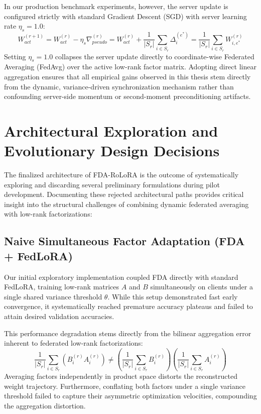 In our production benchmark experiments, however, the server update is configured strictly with standard Gradient Descent (SGD) with server learning rate $\eta_s = 1.0$:
\begin{equation}
    W_{act}^{(r+1)} = W_{act}^{(r)} - \eta_s \nabla_{pseudo}^{(r)} = W_{act}^{(r)} + \frac{1}{|S_r|} \sum_{i \in S_r} \Delta_i^{(e^*)} = \frac{1}{|S_r|} \sum_{i \in S_r} W_{i, e^*}^{(r)}
    \label{eq:server_fedavg}
\end{equation}
Setting $\eta_s = 1.0$ collapses the server update directly to coordinate-wise Federated Averaging (FedAvg) over the active low-rank factor matrix. Adopting direct linear aggregation ensures that all empirical gains observed in this thesis stem directly from the dynamic, variance-driven synchronization mechanism rather than confounding server-side momentum or second-moment preconditioning artifacts.

\section{Architectural Exploration and Evolutionary Design Decisions}
\label{sec:architectural_exploration}

The finalized architecture of FDA-RoLoRA is the outcome of systematically exploring and discarding several preliminary formulations during pilot development. Documenting these rejected architectural paths provides critical insight into the structural challenges of combining dynamic federated averaging with low-rank factorizations:

\subsection{Naive Simultaneous Factor Adaptation (FDA + FedLoRA)}
Our initial exploratory implementation coupled FDA directly with standard FedLoRA, training low-rank matrices $A$ and $B$ simultaneously on clients under a single shared variance threshold $\theta$. While this setup demonstrated fast early convergence, it systematically reached premature accuracy plateaus and failed to attain desired validation accuracies. 

This performance degradation stems directly from the bilinear aggregation error inherent to federated low-rank factorizations:
\begin{equation*}
    \frac{1}{|S_r|} \sum_{i \in S_r} \left( B_i^{(r)} A_i^{(r)} \right) \neq \left( \frac{1}{|S_r|} \sum_{i \in S_r} B_i^{(r)} \right) \left( \frac{1}{|S_r|} \sum_{i \in S_r} A_i^{(r)} \right)
\end{equation*}
Averaging factors independently in product space distorts the reconstructed weight trajectory. Furthermore, conflating both factors under a single variance threshold failed to capture their asymmetric optimization velocities, compounding the aggregation distortion.

